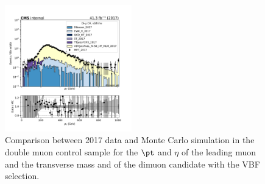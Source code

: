 {\begin{figure}[htbp]
\begin{center}
        \includegraphics[width=0.49\textwidth]{fig/datamc/cr_2m_vbf/cr_2m_vbf_dimuon_pt_losf_2017.pdf}
    \end{center}
    \caption{Comparison between 2017 data and Monte Carlo simulation in the double muon control sample for
        the $\pt$ and $\eta$ of the leading muon and the transverse mass and \pt of the dimuon candidate with the VBF selection.}
    \label{fig:DM_2_vbfhinv_2017}
\end{figure}

}

